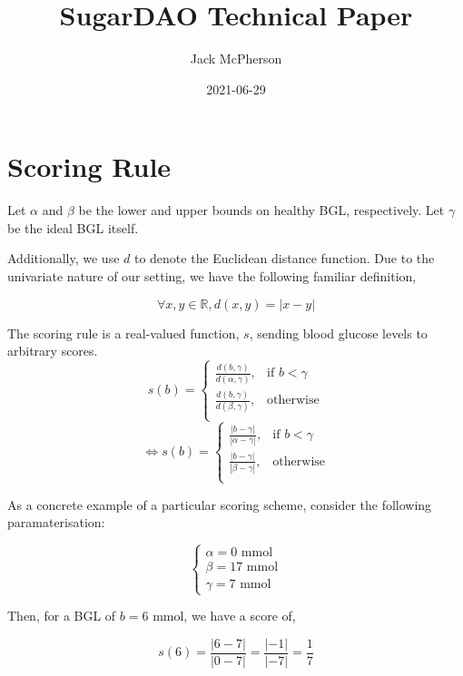 \documentclass[oneside,a4paper]{article}
\theoremstyle{remark}
\begin{document}
   \title{SugarDAO Technical Paper}
    \author{Jack McPherson}
    \date{2021-06-29}
    \maketitle

    \section{Scoring Rule}
        Let \(\alpha\) and \(\beta\) be the lower and upper bounds on healthy BGL, respectively. Let \(\gamma\) be the ideal BGL itself.
        
        Additionally, we use \(d\) to denote the Euclidean distance function. Due to the univariate nature of our setting, we have the following familiar definition,

        \[
            \forall x, y\in\mathbb{R}, d\left(x, y\right)=|x-y|
        \]

        The scoring rule is a real-valued function, \(s\), sending blood glucose levels to arbitrary scores.
        \[
            s\left(b\right)=\left.
                \begin{cases}
                    \frac{d\left(b, \gamma\right)}{d\left(\alpha, \gamma\right)}, & \text{if } b<\gamma\\
                    \frac{d\left(b, \gamma\right)}{d\left(\beta, \gamma\right)}, & \text{otherwise}\\
                \end{cases}\right.
        \]
        \[
            \Leftrightarrow s\left(b\right)=\left.
                \begin{cases}
                    \frac{|b-\gamma|}{|\alpha-\gamma|}, & \text{if } b<\gamma\\
                    \frac{|b-\gamma|}{|\beta-\gamma|}, & \text{otherwise}\\
                \end{cases}\right.
        \]

        As a concrete example of a particular scoring scheme, consider the following paramaterisation:

        \[
            \begin{cases}
                \alpha=0\text{ mmol}\\
                \beta=17\text{ mmol}\\
                \gamma=7\text{ mmol}
            \end{cases}
        \]

        Then, for a BGL of \(b=6\text{ mmol}\), we have a score of,

        \[
            s\left(6\right)=\frac{|6-7|}{|0-7|}=\frac{|-1|}{|-7|}=\frac{1}{7}
        \]

\end{document}
